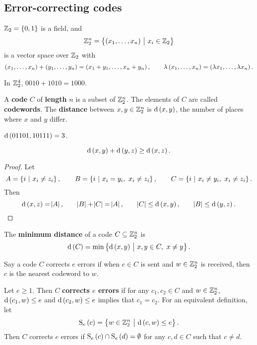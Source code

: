 \subsection{Error-correcting codes}

$ \ZZ_2 = \cbr{0, 1} $ is a field, and
$$ \ZZ_2^n = \cbr{\br{x_1, \dots, x_n} \st x_i \in \ZZ_2} $$
is a vector space over $ \mathbb{Z}_2 $ with
$$ \br{x_1, \dots, x_n} + \br{y_1, \dots, y_n} = \br{x_1 + y_1, \dots, x_n + y_n}, \qquad \lambda\br{x_1, \dots, x_n} = \br{\lambda x_1, \dots, \lambda x_n}. $$

\begin{example*}
In $ \mathbb{Z}_2^4 $, $ 0010 + 1010 = 1000 $.
\end{example*}

\begin{definition*}
A \textbf{code} $ C $ of \textbf{length} $ n $ is a subset of $ \mathbb{Z}_2^n $. The elements of $ C $ are called \textbf{codewords}. The \textbf{distance} between $ x, y \in \mathbb{Z}_2^n $ is $ \d\br{x, y} $, the number of places where $ x $ and $ y $ differ.
\end{definition*}

\begin{example*}
$ \d\br{01101, 10111} = 3 $.
\end{example*}

\begin{proposition}
\label{prop:1.1}
$$ \d\br{x, y} + \d\br{y, z} \ge \d\br{x, z}. $$
\end{proposition}

\begin{proof}
Let
$$ A = \cbr{i \st x_i \ne z_i}, \qquad B = \cbr{i \st x_i = y_i, \ x_i \ne z_i}, \qquad C = \cbr{i \st x_i \ne y_i, \ x_i \ne z_i}. $$
Then
$$ \d\br{x, z} = \abs{A}, \qquad \abs{B} + \abs{C} = \abs{A}, \qquad \abs{C} \le \d\br{x, y}, \qquad \abs{B} \le \d\br{y, z}. $$
\end{proof}


\begin{definition*}
The \textbf{minimum distance} of a code $ C \subseteq \mathbb{Z}_2^n $ is
$$ \d\br{C} = \min\cbr{\d\br{x, y} \st x, y \in C, \ x \ne y}. $$
\end{definition*}

Say a code $ C $ corrects $ e $ errors if when $ c \in C $ is sent and $ w \in \mathbb{Z}_2^n $ is received, then $ c $ is the nearest codeword to $ w $.

\begin{definition*}
Let $ e \ge 1 $. Then $ C $ \textbf{corrects $ e $ errors} if for any $ c_1, c_2 \in C $ and $ w \in \mathbb{Z}_2^n $, $ \d\br{c_1, w} \le e $ and $ \d\br{c_2, w} \le e $ implies that $ c_1 = c_2 $. For an equivalent definition, let
$$ \S_e\br{c} = \cbr{w \in \ZZ_2^n \st \d\br{c, w} \le e}. $$
Then $ C $ corrects $ e $ errors if $ \S_e\br{c} \cap \S_e\br{d} = \emptyset $ for any $ c, d \in C $ such that $ c \ne d $.
\end{definition*}

